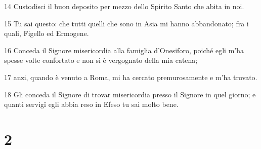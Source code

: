 \par 14 Custodisci il buon deposito per mezzo dello Spirito Santo che abita in noi.
\par 15 Tu sai questo: che tutti quelli che sono in Asia mi hanno abbandonato; fra i quali, Figello ed Ermogene.
\par 16 Conceda il Signore misericordia alla famiglia d'Onesiforo, poiché egli m'ha spesse volte confortato e non si è vergognato della mia catena;
\par 17 anzi, quando è venuto a Roma, mi ha cercato premurosamente e m'ha trovato.
\par 18 Gli conceda il Signore di trovar misericordia presso il Signore in quel giorno; e quanti servigî egli abbia reso in Efeso tu sai molto bene.

\chapter{2}

